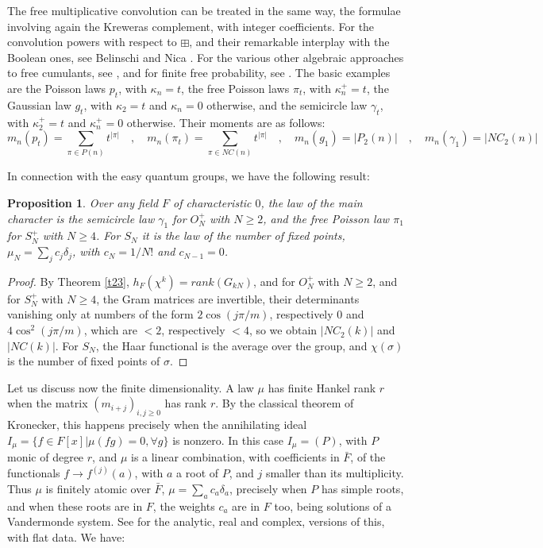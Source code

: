 \documentclass[11pt]{amsart}
\newtheorem{proposition}[theorem]{Proposition}
\theoremstyle{definition}
\begin{document}
The free multiplicative convolution can be treated in the same way, the formulae involving again the Kreweras complement, with integer coefficients. For the convolution powers with respect to $\boxplus$, and their remarkable interplay with the Boolean ones, see Belinschi and Nica \cite{bn1,bn2}. For the various other algebraic approaches to free cumulants, see \cite{dyk,efp,fmk,mni}, and for finite free probability, see \cite{ape,mss}. The basic examples are the Poisson laws $p_t$, with $\kappa_n=t$, the free Poisson laws $\pi_t$, with $\kappa^+_n=t$, the Gaussian law $g_t$, with $\kappa_2=t$ and $\kappa_n=0$ otherwise, and the semicircle law $\gamma_t$, with $\kappa^+_2=t$ and $\kappa^+_n=0$ otherwise. Their moments are as follows:
$$m_n(p_t)=\sum_{\pi\in P(n)}t^{|\pi|}\quad,\quad m_n(\pi_t)=\sum_{\pi\in NC(n)}t^{|\pi|}\quad,\quad m_n(g_1)=|P_2(n)|\quad,\quad m_n(\gamma_1)=|NC_2(n)|$$

In connection with the easy quantum groups, we have the following result:

\begin{proposition}
\label{p63}
Over any field $F$ of characteristic $0$, the law of the main character is the semicircle law $\gamma_1$ for $O_N^+$ with $N\geq2$, and the free Poisson law $\pi_1$ for $S_N^+$ with $N\geq4$. For $S_N$ it is the law of the number of fixed points, $\mu_N=\sum_j c_j\delta_j$, with $c_N=1/N!$ and $c_{N-1}=0$.
\end{proposition}

\begin{proof}
By Theorem \ref{t23}, $h_F(\chi^k)=rank(G_{kN})$, and for $O_N^+$ with $N\geq2$, and for $S_N^+$ with $N\geq4$, the Gram matrices are invertible, their determinants vanishing only at numbers of the form $2\cos(j\pi/m)$, respectively $0$ and $4\cos^2(j\pi/m)$, which are $<2$, respectively $<4$, so we obtain $|NC_2(k)|$ and $|NC(k)|$. For $S_N$, the Haar functional is the average over the group, and $\chi(\sigma)$ is the number of fixed points of $\sigma$.
\end{proof}

Let us discuss now the finite dimensionality. A law $\mu$ has finite Hankel rank $r$ when the matrix $(m_{i+j})_{i,j\geq0}$ has rank $r$. By the classical theorem of Kronecker, this happens precisely when the annihilating ideal $I_\mu=\{f\in F[x]|\mu(fg)=0,\forall g\}$ is nonzero. In this case $I_\mu=(P)$, with $P$ monic of degree $r$, and $\mu$ is a linear combination, with coefficients in $\bar F$, of the functionals $f\to f^{(j)}(a)$, with $a$ a root of $P$, and $j$ smaller than its multiplicity. Thus $\mu$ is finitely atomic over $\bar F$, $\mu=\sum_ac_a\delta_a$, precisely when $P$ has simple roots, and when these roots are in $F$, the weights $c_a$ are in $F$ too, being solutions of a Vandermonde system. See \cite{cfi} for the analytic, real and complex, versions of this, with flat data. We have:
\end{document}
